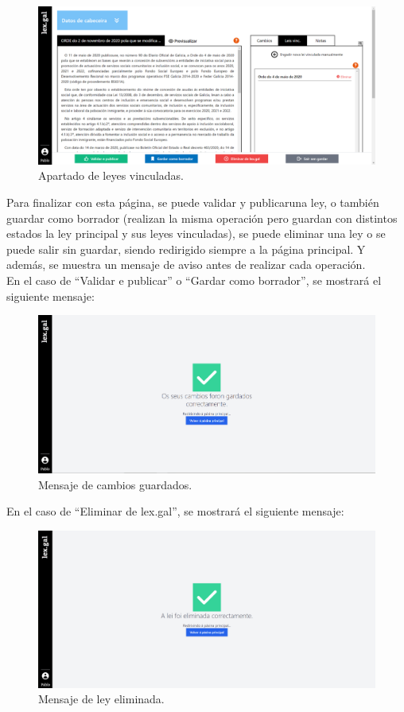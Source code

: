 \begin{figure}[H]
\centerline{\includegraphics[width=15cm]{figuras/manualUsuario/LeyesVinculadas.PNG}}
\caption{Apartado de leyes vinculadas.}
\label{enlaceLeyesVinculadas}
\end{figure}

Para finalizar con esta página, se puede validar y publicaruna ley, o también guardar como borrador (realizan la misma operación pero guardan con distintos estados la ley principal y sus leyes vinculadas), se puede eliminar una ley o se puede salir sin guardar, siendo redirigido siempre a la página principal. Y además, se muestra un mensaje de aviso antes de realizar cada operación.
\\

En el caso de ``Validar e publicar'' o ``Gardar como borrador'', se mostrará el siguiente mensaje:

\begin{figure}[H]
\centerline{\includegraphics[width=15cm]{figuras/manualUsuario/MensajeGuardado.PNG}}
\caption{Mensaje de cambios guardados.}
\label{enlaceCambiosGuardados}
\end{figure}

En el caso de ``Eliminar de lex.gal'', se mostrará el siguiente mensaje:

\begin{figure}[H]
\centerline{\includegraphics[width=15cm]{figuras/manualUsuario/MensajeEliminada.PNG}}
\caption{Mensaje de ley eliminada.}
\label{enlaceLeyEliminada}
\end{figure}
